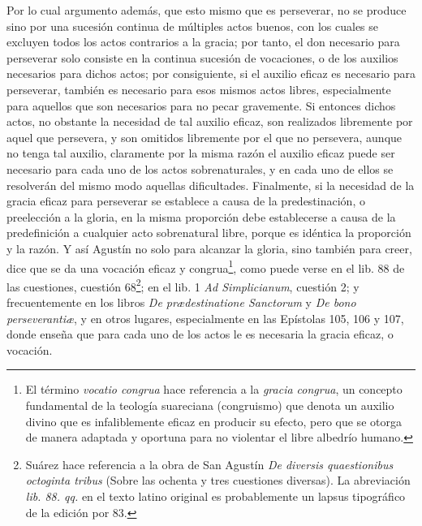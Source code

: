 \documentclass{article}
\begin{document}
Por lo cual argumento además, que esto mismo que es perseverar, no se produce sino por
una sucesión continua de múltiples actos buenos, con los cuales se excluyen todos los
actos contrarios a la gracia; por tanto, el don necesario para perseverar solo consiste
en la continua sucesión de vocaciones, o de los auxilios necesarios para dichos actos;
por consiguiente, si el auxilio eficaz es necesario para perseverar, también es
necesario para esos mismos actos libres, especialmente para aquellos que son necesarios
para no pecar gravemente. Si entonces dichos actos, no obstante la necesidad de tal
auxilio eficaz, son realizados libremente por aquel que persevera, y son omitidos
libremente por el que no persevera, aunque no tenga tal auxilio, claramente por la misma
razón el auxilio eficaz puede ser necesario para cada uno de los actos sobrenaturales, y
en cada uno de ellos se resolverán del mismo modo aquellas dificultades. Finalmente, si
la necesidad de la gracia eficaz para perseverar se establece a causa de la
predestinación, o preelección a la gloria, en la misma proporción debe establecerse a
causa de la predefinición a cualquier acto sobrenatural libre, porque es idéntica la
proporción y la razón. Y así Agustín no solo para alcanzar la gloria, sino también para
creer, dice que se da una vocación eficaz y congrua\footnote{El término \textit{vocatio
congrua} hace referencia a la \textit{gracia congrua}, un concepto fundamental de la
teología suareciana (congruismo) que denota un auxilio divino que es infaliblemente
eficaz en producir su efecto, pero que se otorga de manera adaptada y oportuna para no
violentar el libre albedrío humano.}, como puede verse en el lib. 88 de las cuestiones,
cuestión 68\footnote{Suárez hace referencia a la obra de San Agustín \textit{De diversis
quaestionibus octoginta tribus} (Sobre las ochenta y tres cuestiones diversas). La
abreviación \textit{lib. 88. qq.} en el texto latino original es probablemente un lapsus
tipográfico de la edición por 83.}; en el lib. 1 \textit{Ad Simplicianum}, cuestión 2; y
frecuentemente en los libros \textit{De prædestinatione Sanctorum} y \textit{De bono
perseverantiæ}, y en otros lugares, especialmente en las Epístolas 105, 106 y 107, donde
enseña que para cada uno de los actos le es necesaria la gracia eficaz, o vocación.
\end{document}
